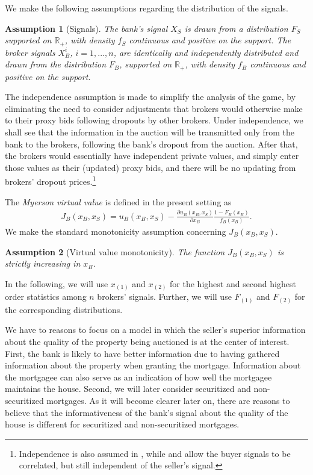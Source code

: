 \documentclass[11pt,twopage]{article}
\newtheorem{assumption}{Assumption}
{\bf}{\it}
\begin{document}
We make the following assumptions regarding the distribution of the signals.
\begin{assumption}[Signals]\label{as:info}
The bank's signal $X_S$ is drawn from a distribution $F_S$ supported on $\mathbb R_{+}$, with density $f_S$ continuous and positive on the support. The broker signals $X_B^i$, $i=1,...,n$, are identically and independently distributed and drawn from the distribution $F_B$, supported on $\mathbb R_{+}$, with density $f_B$ continuous and positive on the support.
\medskip
\end{assumption}
The independence assumption is made to simplify the analysis of the game, by eliminating the need to consider adjustments that brokers would otherwise make to their proxy bids following dropouts by other brokers. Under independence, we shall see that the information in the auction will be transmitted only from the bank to the brokers, following the bank's dropout from the auction. After that, the brokers would essentially have independent private values, and simply enter those values as their (updated) proxy bids, and there will be no updating from brokers' dropout prices.\footnote{Independence is also assumed in \cite{jullien2006auction}, while \cite{cai2007reserve} and  \cite{lamy} allow the buyer signals to be correlated, but still independent of the seller's signal.}

The \emph{Myerson virtual value} is defined in the present setting as 
\begin{align} J_B(x_B,x_S) =
  u_B(x_B,x_S) -\frac{\partial u_B(x_B,x_S)}{\partial x_B}
  \frac{1-F_B(x_B)}{f_B(x_B)}.
  \end{align}
We make the standard monotonicity assumption concerning $J_B(x_B,x_S)$.
\begin{assumption}[Virtual value monotonicity] \label{as:myerson} The function $J_B(x_B,x_S)$ is strictly increasing in $x_B$.
\end{assumption}

In the following, we will use $x_{(1)}$ and $x_{(2)}$ for the highest and second highest order statistics among $n$ brokers' signals. Further, we will use $F_{(1)}$ and $F_{(2)}$ for the corresponding distributions.

We have to reasons to focus on a model in which the seller's superior information about the quality of the property being auctioned is at the center of interest. First, the bank is likely to have better information due to having gathered information about the property when granting the mortgage. Information about the mortgagee can also serve as an indication of how well the mortgagee maintains the house. Second, we will later consider securitized and non-securitized mortgages. As it will become clearer later on, there are reasons to believe that the informativeness of the bank's signal about the quality of the house is different for securitized and non-securitized mortgages.
\end{document}
